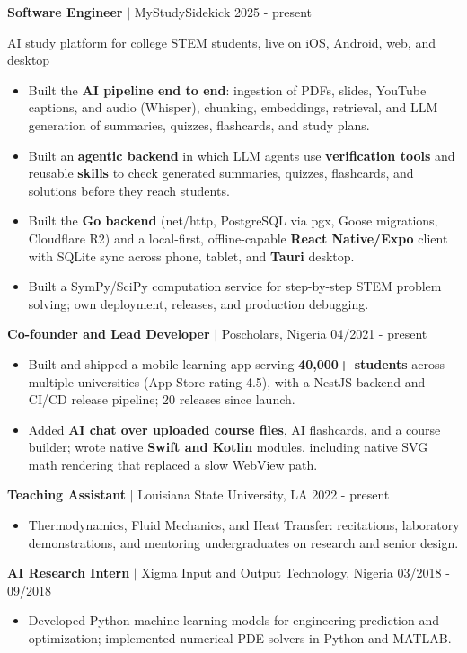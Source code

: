\documentclass[letterpaper,10pt]{article}
\newcommand{\entry}[3]{\textbf{#1} $|$ #2 \hfill #3\par}
\begin{document}
\entry{Software Engineer}{MyStudySidekick}{2025 - present}
AI study platform for college STEM students, live on iOS, Android, web, and desktop
\begin{itemize}
  \item Built the \textbf{AI pipeline end to end}: ingestion of PDFs, slides, YouTube captions, and audio (Whisper), chunking,
        embeddings, retrieval, and LLM generation of summaries, quizzes, flashcards, and study plans.
  \item Built an \textbf{agentic backend} in which LLM agents use \textbf{verification tools} and reusable \textbf{skills} to check
        generated summaries, quizzes, flashcards, and solutions before they reach students.
  \item Built the \textbf{Go backend} (net/http, PostgreSQL via pgx, Goose migrations, Cloudflare R2) and a local-first,
        offline-capable \textbf{React Native/Expo} client with SQLite sync across phone, tablet, and \textbf{Tauri} desktop.
  \item Built a SymPy/SciPy computation service for step-by-step STEM problem solving; own deployment, releases,
        and production debugging.
\end{itemize}

\entry{Co-founder and Lead Developer}{Poscholars, Nigeria}{04/2021 - present}
\begin{itemize}
  \item Built and shipped a mobile learning app serving \textbf{40,000+ students} across multiple universities
        (App Store rating 4.5), with a NestJS backend and CI/CD release pipeline; 20 releases since launch.
  \item Added \textbf{AI chat over uploaded course files}, AI flashcards, and a course builder; wrote native
        \textbf{Swift and Kotlin} modules, including native SVG math rendering that replaced a slow WebView path.
\end{itemize}

\entry{Teaching Assistant}{Louisiana State University, LA}{2022 - present}
\begin{itemize}
  \item Thermodynamics, Fluid Mechanics, and Heat Transfer: recitations, laboratory demonstrations, and mentoring
        undergraduates on research and senior design.
\end{itemize}

\entry{AI Research Intern}{Xigma Input and Output Technology, Nigeria}{03/2018 - 09/2018}
\begin{itemize}
  \item Developed Python machine-learning models for engineering prediction and optimization; implemented numerical
        PDE solvers in Python and MATLAB.
\end{itemize}
\end{document}
